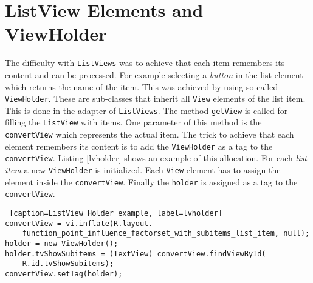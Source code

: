 \section{ListView Elements and ViewHolder}

The difficulty with \texttt{ListViews} was to achieve that each item remembers its content and can be processed. For example selecting a \textit{button} in the list element which returns the name of the item. This was achieved by using so-called \texttt{ViewHolder}. These are sub-classes that inherit all \texttt{View} elements of the list item. This is done in the adapter of \texttt{ListViews}. The method \texttt{getView} is called for filling the \texttt{ListView} with items. One parameter of this method is the \texttt{convertView} which represents the actual item. The trick to achieve that each element remembers its content is to add the \texttt{ViewHolder} as a tag to the \texttt{convertView}. Listing \ref{lvholder} shows an example of this allocation. For each \textit{list item} a new \texttt{ViewHolder} is initialized. Each \texttt{View} element has to assign the element inside the \texttt{convertView}. Finally the \texttt{holder} is assigned as a tag to the \texttt{convertView}.
\begin{lstlisting} [caption=ListView Holder example, label=lvholder] 
convertView = vi.inflate(R.layout.
	function_point_influence_factorset_with_subitems_list_item, null);
holder = new ViewHolder();
holder.tvShowSubitems = (TextView) convertView.findViewById(
	R.id.tvShowSubitems);
convertView.setTag(holder);
\end{lstlisting}
